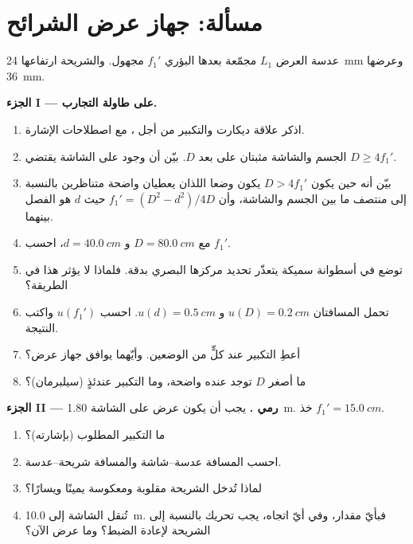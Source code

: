 \section{مسألة: جهاز عرض الشرائح}

\begin{problem}
\label{pb:b1:mirrors-thin-lenses:1}
عدسة العرض $L_1$  مجمّعة بعدها البؤري $f_1'$ مجهول.
والشريحة ارتفاعها \qty{24}{mm} وعرضها \qty{36}{mm}.

\medskip
\noindent\textbf{الجزء I ---  على طاولة التجارب.}
\begin{enumerate}
  \item اذكر علاقة ديكارت والتكبير من أجل ، مع اصطلاحات الإشارة.
  \item الجسم والشاشة مثبتان على بعد $D$. بيّن أن وجود
         على الشاشة يقتضي $D \geq 4f_1'$.
  \item بيّن أنه حين يكون $D > 4f_1'$ يكون وضعا  اللذان يعطيان
         واضحة متناظرين بالنسبة إلى منتصف ما بين
        الجسم والشاشة، وأن $f_1' = (D^2 - d^2)/4D$ حيث $d$
        هو الفصل بينهما.
  \item مع $D = \qty{80.0}{cm}$ و $d = \qty{40.0}{cm}$، احسب
        $f_1'$.
  \item توضع  في أسطوانة سميكة يتعذّر تحديد مركزها البصري
        بدقة. فلماذا لا يؤثر هذا في الطريقة؟
  \item تحمل المسافتان $u(D) = \qty{0.2}{cm}$ و
        $u(d) = \qty{0.5}{cm}$. احسب $u(f_1')$ واكتب النتيجة.
  \item أعطِ التكبير عند كلٍّ من الوضعين. وأيّهما
        يوافق جهاز عرض؟
  \item ما أصغر $D$ توجد عنده  واضحة، وما
        التكبير عندئذٍ (سيلبرمان)؟
\end{enumerate}

\medskip
\noindent\textbf{الجزء II --- رمي .}
يجب أن يكون عرض  على الشاشة \qty{1.80}{m}. خذ
$f_1' = \qty{15.0}{cm}$.
\begin{enumerate}[resume]
  \item ما التكبير المطلوب (بإشارته)؟
  \item احسب المسافة عدسة--شاشة والمسافة شريحة--عدسة.
  \item لماذا تُدخل الشريحة مقلوبة ومعكوسة يمينًا ويسارًا؟
  \item تُنقل الشاشة إلى \qty{10.0}{m}. فبأيّ مقدار، وفي أيّ
        اتجاه، يجب تحريك  بالنسبة إلى الشريحة لإعادة الضبط؟
        وما عرض  الآن؟
\end{enumerate}


\end{problem}

